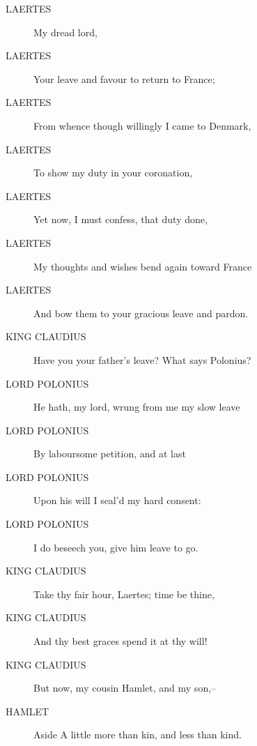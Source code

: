 \documentclass{article}
\begin{document}
\begin{description}
            
\item[LAERTES] My dread lord,
\item[LAERTES] Your leave and favour to return to France;
\item[LAERTES] From whence though willingly I came to Denmark,
\item[LAERTES] To show my duty in your coronation,
\item[LAERTES] Yet now, I must confess, that duty done,
\item[LAERTES] My thoughts and wishes bend again toward France
\item[LAERTES] And bow them to your gracious leave and pardon.
\end{description}
          
\begin{description}
            
\item[KING CLAUDIUS] Have you your father's leave? What says Polonius?
\end{description}
          
\begin{description}
            
\item[LORD POLONIUS] He hath, my lord, wrung from me my slow leave
\item[LORD POLONIUS] By laboursome petition, and at last
\item[LORD POLONIUS] Upon his will I seal'd my hard consent:
\item[LORD POLONIUS] I do beseech you, give him leave to go.
\end{description}
          
\begin{description}
            
\item[KING CLAUDIUS] Take thy fair hour, Laertes; time be thine,
\item[KING CLAUDIUS] And thy best graces spend it at thy will!
\item[KING CLAUDIUS] But now, my cousin Hamlet, and my son,--
\end{description}
          
\begin{description}
            
\item[HAMLET] 
               Aside  A little more than kin, and less than kind.
\end{description}
          
\end{document}
